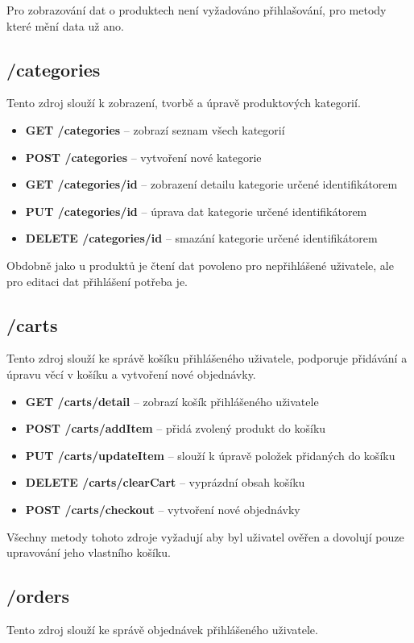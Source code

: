 \documentclass[thesis=M,czech]{FITthesis}[2019/12/23]
\begin{document}
Pro zobrazování dat o produktech není vyžadováno přihlašování, pro metody které mění data už ano.

\subsection{/categories}
Tento zdroj slouží k zobrazení, tvorbě a úpravě produktových kategorií.

\begin{itemize}
  \item \textbf{GET /categories} -- zobrazí seznam všech kategorií
  \item \textbf{POST /categories} -- vytvoření nové kategorie
  \item \textbf{GET /categories/{id}} -- zobrazení detailu kategorie určené identifikátorem
  \item \textbf{PUT /categories/{id}} -- úprava dat kategorie určené identifikátorem
  \item \textbf{DELETE /categories/{id}} -- smazání kategorie určené identifikátorem
\end{itemize}

Obdobně jako u produktů je čtení dat povoleno pro nepřihlášené uživatele, ale pro editaci dat přihlášení potřeba je.

\subsection{/carts}
Tento zdroj slouží ke správě košíku přihlášeného uživatele, podporuje přidávání a úpravu věcí v košíku a vytvoření nové objednávky.

\begin{itemize}
  \item \textbf{GET /carts/detail} -- zobrazí košík přihlášeného uživatele
  \item \textbf{POST /carts/addItem} -- přidá zvolený produkt do košíku
  \item \textbf{PUT /carts/updateItem} -- slouží k úpravě položek přidaných do košíku
  \item \textbf{DELETE /carts/clearCart} -- vyprázdní obsah košíku
  \item \textbf{POST /carts/checkout} -- vytvoření nové objednávky
\end{itemize}

Všechny metody tohoto zdroje vyžadují aby byl uživatel ověřen a dovolují pouze upravování jeho vlastního košíku.

\subsection{/orders}
Tento zdroj slouží ke správě objednávek přihlášeného uživatele.
\end{document}
